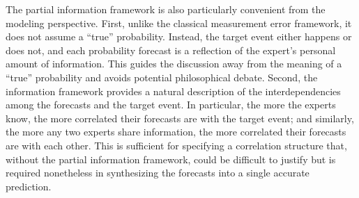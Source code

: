 \documentclass[11pt]{article}
\theoremstyle{definition}
\theoremstyle{definition}
\begin{document}
The partial information framework is also particularly convenient from the modeling perspective. First, unlike the classical measurement error framework, it does not assume a ``true'' probability. Instead, the target event either happens or does not, and each probability forecast is a reflection of the expert's personal amount of information.  This guides the discussion away from the meaning of a ``true'' probability and avoids potential philosophical debate. Second, the information framework provides a natural description of the interdependencies among the forecasts and the target event. In particular, the more the experts know, the more correlated their forecasts are with the target event; and similarly, the more any two experts share information, the more correlated their forecasts are with each other. This is sufficient for specifying a correlation structure that, without the partial information framework, could be difficult to justify but is required nonetheless in synthesizing the forecasts into a single accurate prediction.




\end{document}
